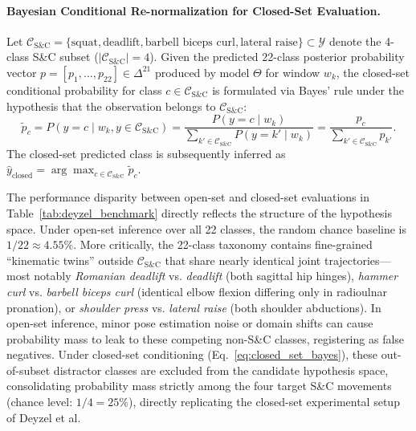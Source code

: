 \documentclass[runningheads]{llncs}
\begin{document}
\paragraph{Bayesian Conditional Re-normalization for Closed-Set Evaluation.}
Let $\mathcal{C}_{\text{S\&C}} = \{\text{squat}, \text{deadlift}, \text{barbell biceps curl}, \text{lateral raise}\} \subset \mathcal{Y}$ denote the 4-class S\&C subset ($|\mathcal{C}_{\text{S\&C}}| = 4$). Given the predicted 22-class posterior probability vector $p = [p_1, \dots, p_{22}] \in \Delta^{21}$ produced by model $\Theta$ for window $w_k$, the closed-set conditional probability for class $c \in \mathcal{C}_{\text{S\&C}}$ is formulated via Bayes' rule under the hypothesis that the observation belongs to $\mathcal{C}_{\text{S\&C}}$:
\begin{equation}
\label{eq:closed_set_bayes}
    \tilde{p}_c = P(y = c \mid w_k, y \in \mathcal{C}_{\text{S\&C}}) = \frac{P(y = c \mid w_k)}{\sum_{k' \in \mathcal{C}_{\text{S\&C}}} P(y = k' \mid w_k)} = \frac{p_c}{\sum_{k' \in \mathcal{C}_{\text{S\&C}}} p_{k'}}.
\end{equation}
The closed-set predicted class is subsequently inferred as $\hat{y}_{\text{closed}} = \arg\max_{c \in \mathcal{C}_{\text{S\&C}}} \tilde{p}_c$. 

The performance disparity between open-set and closed-set evaluations in Table~\ref{tab:deyzel_benchmark} directly reflects the structure of the hypothesis space. Under open-set inference over all 22 classes, the random chance baseline is $1/22 \approx 4.55\%$. More critically, the 22-class taxonomy contains fine-grained ``kinematic twins'' outside $\mathcal{C}_{\text{S\&C}}$ that share nearly identical joint trajectories---most notably \textit{Romanian deadlift} vs. \textit{deadlift} (both sagittal hip hinges), \textit{hammer curl} vs. \textit{barbell biceps curl} (identical elbow flexion differing only in radioulnar pronation), or \textit{shoulder press} vs. \textit{lateral raise} (both shoulder abductions). In open-set inference, minor pose estimation noise or domain shifts can cause probability mass to leak to these competing non-S\&C classes, registering as false negatives. Under closed-set conditioning (Eq.~\eqref{eq:closed_set_bayes}), these out-of-subset distractor classes are excluded from the candidate hypothesis space, consolidating probability mass strictly among the four target S\&C movements (chance level: $1/4 = 25\%$), directly replicating the closed-set experimental setup of Deyzel et al.
\end{document}
